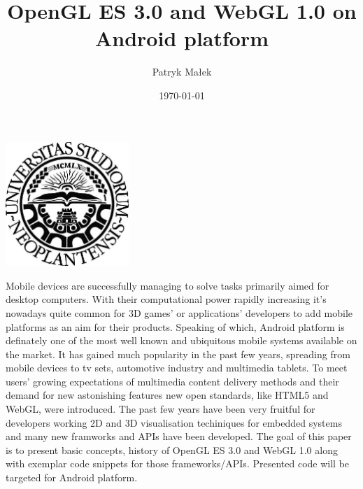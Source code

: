 \documentclass[a4paper,11pt]{article}
\renewenvironment{abstract}
{\itshape \small
  \begin{center}
  \bfseries \abstractname\vspace{-.5em}\vspace{0pt}
  \end{center}
  \list{}{
    \setlength{\leftmargin}{1.5cm}%
    \setlength{\rightmargin}{\leftmargin}%
  }%
  \item\relax}
{\endlist}
\begin{document}
\label{Title} 
\title{OpenGL ES 3.0 and WebGL 1.0 on Android platform \vspace{1pc}}
\author{Patryk Małek \vspace{-0.7pc}}
\date{\today}         %
\maketitle
\thispagestyle{empty}


\vspace{5pc}

\centerline{
\includegraphics[width=0.35\textwidth,height=0.35\textheight,keepaspectratio]{NoviSadLogoGray.jpg}
}

\vspace{9pc}

\begin{abstract}
\label{Abstract}
Mobile devices are successfully managing to solve tasks primarily aimed for desktop computers.
With their computational power rapidly increasing it's nowadays quite common for 3D games' or applications' developers to add mobile platforms as an aim for their products.  
Speaking of which, Android platform is definately one of the most well known and ubiquitous mobile systems available on the market.
It has gained much popularity in the past few years, spreading from mobile devices to tv sets, automotive industry and multimedia tablets. 
\newline To meet users' growing expectations of multimedia content delivery methods and their demand for new astonishing features new open standards, like HTML5 and WebGL, were introduced. 
The past few years have been very fruitful for developers working 2D and 3D visualisation techiniques for embedded systems and many new framworks and APIs have been developed.
\newline The goal of this paper is to present basic concepts, history of OpenGL ES 3.0 and WebGL 1.0 along with exemplar code snippets for those frameworks/APIs.
Presented code will be targeted for Android platform.
\end{abstract}
\pagebreak
\end{document}
